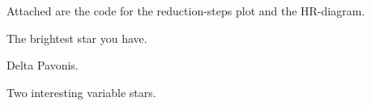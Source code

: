 \documentclass{aa}
\begin{document}
Attached are the code for the reduction-steps plot and the HR-diagram.

The brightest star you have.

Delta Pavonis.

Two interesting variable stars.



\end{document}
